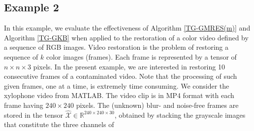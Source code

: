 \documentclass{siamltex}
\newcommand{\1}{\mathbb{1}}
\newcommand{\0}{\mathbb{0}}
\begin{document}
	\subsection{Example 2} 
	In this example, we evaluate the effectiveness of Algorithm \ref{TG-GMRES(m)} and Algorithm \ref{TG-GKB} when applied to the restoration of a color video defined by a sequence of RGB images. Video restoration is the problem of restoring a sequence of $k$ color images (frames). Each frame is represented by a tensor of $n \times n\times3$ pixels. In the present example, we are interested in restoring 10 consecutive frames of a contaminated video. Note that the processing of such given frames, one  at a time, is extremely time consuming. We consider the xylophone video from MATLAB. The video clip is in MP4 format with each frame having $240 \times 240$ pixels. The (unknown) blur- and noise-free frames are stored in the tensor $\widehat{ \mathscr X} \in \mathbb{R}^{240 \times 240\times30}$, obtained by stacking the grayscale images that constitute the three channels of
\end{document}
